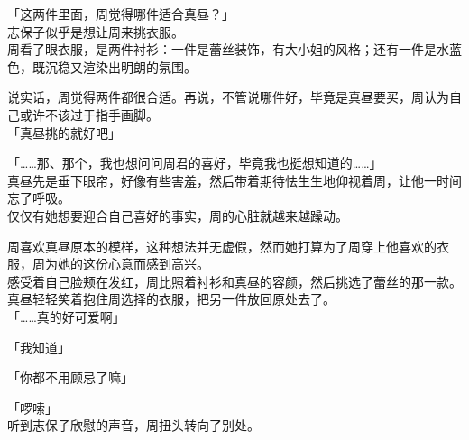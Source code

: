 「这两件里面，周觉得哪件适合真昼？」\\

志保子似乎是想让周来挑衣服。\\

周看了眼衣服，是两件衬衫：一件是蕾丝装饰，有大小姐的风格；还有一件是水蓝色，既沉稳又渲染出明朗的氛围。

说实话，周觉得两件都很合适。再说，不管说哪件好，毕竟是真昼要买，周认为自己或许不该过于指手画脚。\\

「真昼挑的就好吧」

「……那、那个，我也想问问周君的喜好，毕竟我也挺想知道的……」\\

真昼先是垂下眼帘，好像有些害羞，然后带着期待怯生生地仰视着周，让他一时间忘了呼吸。\\

仅仅有她想要迎合自己喜好的事实，周的心脏就越来越躁动。

周喜欢真昼原本的模样，这种想法并无虚假，然而她打算为了周穿上他喜欢的衣服，周为她的这份心意而感到高兴。\\

感受着自己脸颊在发红，周比照着衬衫和真昼的容颜，然后挑选了蕾丝的那一款。\\

真昼轻轻笑着抱住周选择的衣服，把另一件放回原处去了。\\

「……真的好可爱啊」

「我知道」

「你都不用顾忌了嘛」

「啰嗦」\\

听到志保子欣慰的声音，周扭头转向了别处。
